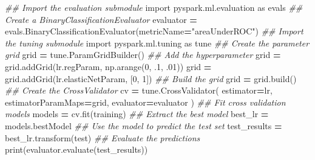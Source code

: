 \documentclass[]{book}
\newenvironment{Shaded}{\begin{snugshade}}{\end{snugshade}}
\newcommand{\DecValTok}[1]{\textcolor[rgb]{0.00,0.00,0.81}{#1}}
\newcommand{\StringTok}[1]{\textcolor[rgb]{0.31,0.60,0.02}{#1}}
\newcommand{\ImportTok}[1]{#1}
\newcommand{\CommentTok}[1]{\textcolor[rgb]{0.56,0.35,0.01}{\textit{#1}}}
\newcommand{\OperatorTok}[1]{\textcolor[rgb]{0.81,0.36,0.00}{\textbf{#1}}}
\newcommand{\BuiltInTok}[1]{#1}
\newcommand{\NormalTok}[1]{#1}
\theoremstyle{definition}
\theoremstyle{definition}
\theoremstyle{definition}
\theoremstyle{remark}
\begin{document}
\begin{Shaded}
\begin{Highlighting}[]
\CommentTok{## Import the evaluation submodule}
\ImportTok{import}\NormalTok{ pyspark.ml.evaluation }\ImportTok{as}\NormalTok{ evals}
\CommentTok{## Create a BinaryClassificationEvaluator}
\NormalTok{evaluator }\OperatorTok{=}\NormalTok{ evals.BinaryClassificationEvaluator(metricName}\OperatorTok{=}\StringTok{"areaUnderROC"}\NormalTok{)}
\CommentTok{## Import the tuning submodule}
\ImportTok{import}\NormalTok{ pyspark.ml.tuning }\ImportTok{as}\NormalTok{ tune}
\CommentTok{## Create the parameter grid}
\NormalTok{grid }\OperatorTok{=}\NormalTok{ tune.ParamGridBuilder()}
\CommentTok{## Add the hyperparameter}
\NormalTok{grid }\OperatorTok{=}\NormalTok{ grid.addGrid(lr.regParam, np.arange(}\DecValTok{0}\NormalTok{, .}\DecValTok{1}\NormalTok{, .}\DecValTok{01}\NormalTok{))}
\NormalTok{grid }\OperatorTok{=}\NormalTok{ grid.addGrid(lr.elasticNetParam, [}\DecValTok{0}\NormalTok{, }\DecValTok{1}\NormalTok{])}
\CommentTok{## Build the grid}
\NormalTok{grid }\OperatorTok{=}\NormalTok{ grid.build()}
\CommentTok{## Create the CrossValidator}
\NormalTok{cv }\OperatorTok{=}\NormalTok{ tune.CrossValidator(}
\NormalTok{estimator}\OperatorTok{=}\NormalTok{lr,}
\NormalTok{estimatorParamMaps}\OperatorTok{=}\NormalTok{grid,}
\NormalTok{evaluator}\OperatorTok{=}\NormalTok{evaluator}
\NormalTok{               )}
\CommentTok{## Fit cross validation models}
\NormalTok{models }\OperatorTok{=}\NormalTok{ cv.fit(training)}
\CommentTok{## Extract the best model}
\NormalTok{best_lr }\OperatorTok{=}\NormalTok{ models.bestModel}
\CommentTok{## Use the model to predict the test set}
\NormalTok{test_results }\OperatorTok{=}\NormalTok{ best_lr.transform(test)}
\CommentTok{## Evaluate the predictions}
\BuiltInTok{print}\NormalTok{(evaluator.evaluate(test_results))}
\end{Highlighting}
\end{Shaded}
\end{document}
